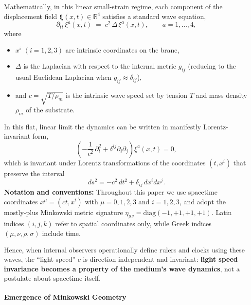 Mathematically, in this linear small-strain regime, each component of
the displacement field $\boldsymbol{\xi}(x,t)\in\mathbb{R}^4$
satisfies a standard wave equation,
\[
\partial_{tt}\,\xi^{a}(x,t) \;=\; c^2\,\Delta\,\xi^{a}(x,t),
\qquad a=1,\dots,4,
\]
where
\begin{itemize}
  \item $x^i$ $(i=1,2,3)$ are intrinsic coordinates on the brane,
  \item $\Delta$ is the Laplacian with respect to the internal metric
        $g_{ij}$ (reducing to the usual Euclidean Laplacian when
        $g_{ij}\approx\delta_{ij}$),
  \item and $c=\sqrt{T/\rho_m}$ is the intrinsic wave speed set by
        tension $T$ and mass density $\rho_m$ of the substrate.
\end{itemize}

In this flat, linear limit the dynamics can be written in manifestly
Lorentz-invariant form,
\[
\left(-\frac{1}{c^2}\,\partial_t^2 + \delta^{ij}\partial_i\partial_j\right)
\xi^{a}(x,t) = 0,
\]
which is invariant under Lorentz transformations of the coordinates
$(t,x^i)$ that preserve the interval
\[
ds^2 = -c^2\,dt^2 + \delta_{ij}\,dx^i dx^j.
\]
\textbf{Notation and conventions:} Throughout this paper we use
spacetime coordinates $x^\mu = (ct,x^i)$ with $\mu=0,1,2,3$ and
$i=1,2,3$, and adopt the mostly-plus Minkowski metric signature
$\eta_{\mu\nu} = \mathrm{diag}(-1,+1,+1,+1)$. Latin indices
$(i,j,k)$ refer to spatial coordinates only, while Greek indices
$(\mu,\nu,\rho,\sigma)$ include time.

Hence, when internal observers operationally define rulers and clocks
using these waves, the ``light speed'' $c$ is direction-independent
and invariant: \textbf{light speed invariance becomes a property of the
medium's wave dynamics}, not a postulate about spacetime itself.

\paragraph{Emergence of Minkowski
Geometry}\label{emergence-of-minkowski-geometry}

